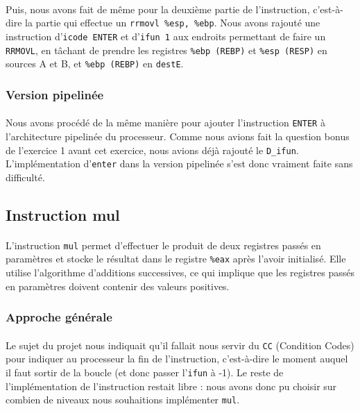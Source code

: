 \documentclass[12pt]{article}
\begin{document}
\paragraph{}Puis, nous avons fait de même pour la deuxième partie de l'instruction, c'est-à-dire la partie qui effectue un \verb+rrmovl %esp, %ebp+. Nous avons rajouté une instruction d'\verb+icode ENTER+ et d'\verb+ifun 1+ aux endroits permettant de faire un \verb+RRMOVL+, en tâchant de prendre les registres \verb+%ebp (REBP)+ et \verb+%esp (RESP)+ en sources A et B, et \verb+%ebp (REBP)+ en \verb+destE+.

\subsubsection{Version pipelinée}
\paragraph{}Nous avons procédé de la même manière pour ajouter l'instruction \verb+ENTER+ à l'architecture pipelinée du processeur. Comme nous avions fait la question bonus de l'exercice 1 avant cet exercice, nous avions déjà rajouté le \verb+D_ifun+. L'implémentation d'\verb+enter+ dans la version pipelinée s'est donc vraiment faite sans difficulté.


\subsection{Instruction mul}
\paragraph{}L'instruction \verb+mul+ permet d'effectuer le produit de deux registres passés en paramètres et stocke le résultat dans le registre \verb+%eax+ après l'avoir initialisé. Elle utilise l'algorithme d'additions successives, ce qui implique que les registres passés en paramètres doivent contenir des valeurs positives.  

\subsubsection{Approche générale}
\paragraph{}Le sujet du projet nous indiquait qu'il fallait nous servir du \verb+CC+ (Condition Codes) pour indiquer au processeur la fin de l'instruction, c'est-à-dire le moment auquel il faut sortir de la boucle (et donc passer l'\verb+ifun+ à -1). Le reste de l'implémentation de l'instruction restait libre : nous avons donc pu choisir sur combien de niveaux nous souhaitions implémenter \verb+mul+.
\end{document}
